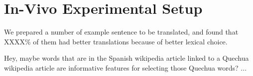 \documentclass[10pt, a4paper]{article}
\begin{document}
\section{In-Vivo Experimental Setup}
We prepared a number of example sentence to be translated, and found that
XXXX\% of them had better translations because of better lexical choice.


Hey, maybe words that are in the Spanish wikipedia article linked to a Quechua
wikipedia article are informative features for selecting those Quechua words?
...

\end{document}
